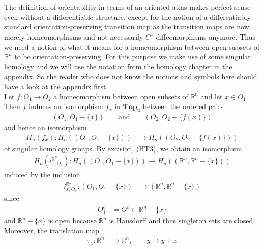 \\\\
The definition of orientability in terms of an oriented atlas makes perfect sense even without a differentiable structure, except for the notion of a differentiably standard orientation-preserving transition map as the transition maps are now merely homeomorphisms and not necessarily $C^{1}$-diffeomorphisms anymore. Thus we need a notion of what it means for a homeomorphism between open subsets of $\mathbb{R}^{n}$ to be orientation-preserving. For this purpose we make use of some singular homology and we will use the notation from the homology chapter in the appendix. So the reader who does not know the notions and symbols here should have a look at the appendix first.
\\
Let $f \colon O_{1} \to O_{2}$ a homeomorphism between open subsets of $\mathbb{R}^{n}$ and let $x \in O_{1}$. Then $f$ induces an isomorphism $f_{x}$ in $\mathbf{Top_{2}}$ between the ordered pairs
\begin{align*}
  (O_{1},O_{1} - \lbrace x \rbrace)
  \qquad
  \text{and}
  \qquad
  (O_{2},O_{2} - \lbrace f(x) \rbrace)
\end{align*}
and hence an isomorphism
\begin{align*}
  H_{n}(f_{x})
  \colon
  H_{n}
  \left(
    (O_{1},O_{1} - \lbrace x \rbrace)
  \right)
  &\to
  H_{n}
  \left(
    (O_{2},O_{2} - \lbrace f(x) \rbrace)
  \right)
\end{align*}
of singular homology groups. By excision, (HT3), we obtain an isomorphism
\begin{align*}
  H_{n}
  \left(
    i_{x,O_{1}}^{\mathbb{R}^{n}}
  \right)
  \colon
  H_{n}
  \left(
    (O_{1},O_{1} - \lbrace x \rbrace)
  \right)
  \to
  H_{n}
  \left(
    (\mathbb{R}^{n},\mathbb{R}^{n} - \lbrace x \rbrace)
  \right)
\end{align*}
induced by the inclusion
\begin{align*}
  i_{x,O_{1}}^{\mathbb{R}^{n}}
  \colon
  (O_{1},O_{1} - \lbrace x \rbrace)
  &\to
  (\mathbb{R}^{n},\mathbb{R}^{n} - \lbrace x \rbrace)
\end{align*}
since
\begin{align*}
  \overline{O_{1}^{c}}
  &=
  O_{1}^{c}
  \subset
  \mathbb{R}^{n}
  -
  \lbrace x \rbrace
\end{align*}
and $\mathbb{R}^{n} - \lbrace x \rbrace$ is open because $\mathbb{R}^{n}$ is Hausdorff and thus singleton sets are closed. Moreover, the translation map
\begin{align*}
  \tau_{x}
  \colon
  \mathbb{R}^{n}
  &\to
  \mathbb{R}^{n}
  ,\qquad
  y
  \mapsto
  y + x
\end{align*}
